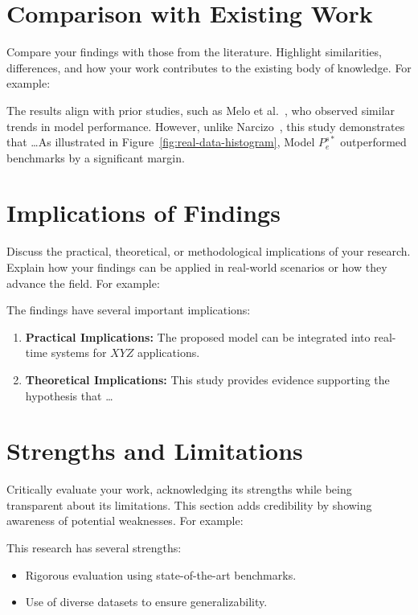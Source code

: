 \section{Comparison with Existing Work}\label{sec:comparison-existing-work}
Compare your findings with those from the literature. Highlight similarities, differences, and how your work contributes to the existing body of knowledge. For example:

The results align with prior studies, such as Melo et al.~\cite{Melo2017}, who observed similar trends in model performance. However, unlike Narcizo~\cite{Narcizo2013}, this study demonstrates that \dots As illustrated in Figure~\ref{fig:real-data-histogram}, Model $P_e^{s*}$ outperformed benchmarks by a significant margin.

\section{Implications of Findings}\label{sec:implications-findings}
Discuss the practical, theoretical, or methodological implications of your research. Explain how your findings can be applied in real-world scenarios or how they advance the field. For example:

The findings have several important implications:
\begin{enumerate}
    \item \textbf{Practical Implications:} The proposed model can be integrated into real-time systems for $XYZ$ applications.
    \item \textbf{Theoretical Implications:} This study provides evidence supporting the hypothesis that \dots
\end{enumerate}

\section{Strengths and Limitations}\label{sec:strengths-limitations}
Critically evaluate your work, acknowledging its strengths while being transparent about its limitations. This section adds credibility by showing awareness of potential weaknesses. For example:

This research has several strengths:
\begin{itemize}
    \item Rigorous evaluation using state-of-the-art benchmarks.
    \item Use of diverse datasets to ensure generalizability.
\end{itemize}

